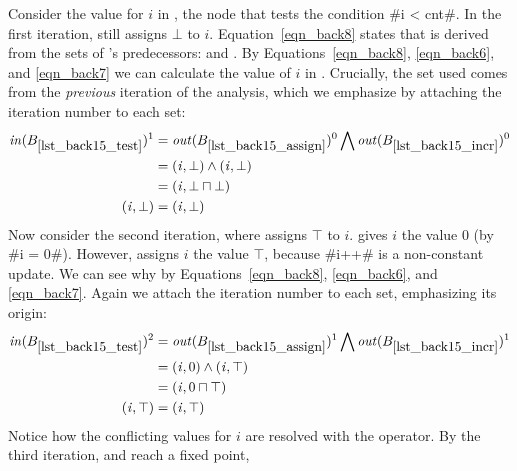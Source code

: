 \documentclass[12pt]{report}
\begin{document}
Consider the value for $i$ in , the node that
tests the condition #i < cnt#. In the first iteration,
 still assigns $\bot$ to
$i$. Equation~\eqref{eqn_back8} states that  is
derived from the \out sets of 's
predecessors:  and
. By Equations~\eqref{eqn_back8},
\eqref{eqn_back6}, and \eqref{eqn_back7} we can calculate the value of
$i$ in . Crucially, the \out set used comes from
the \emph{previous} iteration of the analysis, which we emphasize by
attaching the iteration number to each set:
\begin{align*}
  \inB{lst_back15_test}^1 &= \outB{lst_back15_assign}^0 \bigwedge \outB{lst_back15_incr}^0 \\
  &= {\factC{i}{\bot}} \wedge {\factC{i}{\bot}} \\
  &= {\factC{i}{\bot \lub \bot}} \\
  {\factC{i}{\bot}} &= {\factC{i}{\bot}}
\end{align*}
Now consider the second iteration, where  assigns
$\top$ to $i$.  gives $i$ the value
0 (by #i = 0#). However,  assigns $i$ the value $\top$,
because #i++# is a non-constant update. We can see why by
Equations~\eqref{eqn_back8}, \eqref{eqn_back6}, and
\eqref{eqn_back7}. Again we attach the iteration number to each set,
emphasizing its origin:
\begin{align*}
  \inB{lst_back15_test}^2 &= \outB{lst_back15_assign}^1 \bigwedge \outB{lst_back15_incr}^1 \\
  &= {\factC{i}{0}} \wedge {\factC{i}{\top}} \\
  &= {\factC{i}{0 \lub \top}} \\
  {\factC{i}{\top}} &= {\factC{i}{\top}}
\end{align*}
Notice how the conflicting values for $i$ are resolved with the \lub
operator. By the third iteration,  and
 reach a fixed point,
\end{document}
